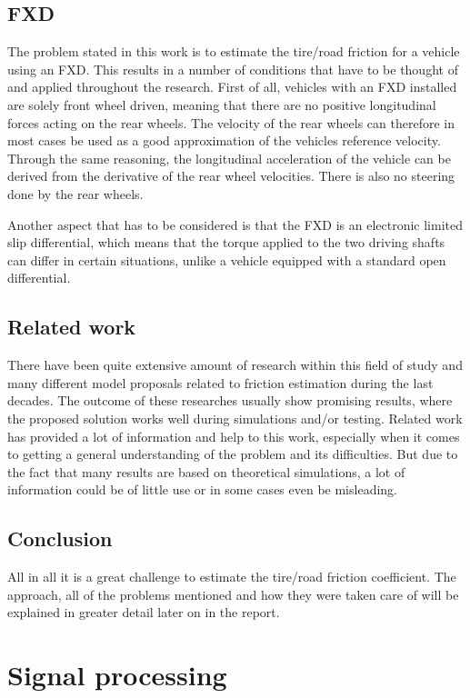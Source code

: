 \subsection{FXD}
The problem stated in this work is to estimate the tire/road friction for a vehicle using an FXD. This results in a number of conditions that have to be thought of and applied throughout the research. First of all, vehicles with an FXD installed are solely front wheel driven, meaning that there are no positive longitudinal forces acting on the rear wheels. The velocity of the rear wheels can therefore in most cases be used as a good approximation of the vehicles reference velocity. Through the same reasoning, the longitudinal acceleration of the vehicle can be derived from the derivative of the rear wheel velocities. There is also no steering done by the rear wheels.

Another aspect that has to be considered is that the FXD is an electronic limited slip differential, which means that the torque applied to the two driving shafts can differ in certain situations, unlike a vehicle equipped with a standard open differential.

\subsection{Related work}
There have been quite extensive amount of research within this field of study and many different model proposals related to friction estimation during the last decades. The outcome of these researches usually show promising results, where the proposed solution works well during simulations and/or testing. Related work has provided a lot of information and help to this work, especially when it comes to getting a general understanding of the problem and its difficulties. But due to the fact that many results are based on theoretical simulations, a lot of information could be of little use or in some cases even be misleading.

\subsection{Conclusion}
All in all it is a great challenge to estimate the tire/road friction coefficient.  The approach, all of the problems mentioned and how they were taken care of will be explained in greater detail later on in the report.

\section{Signal processing}

